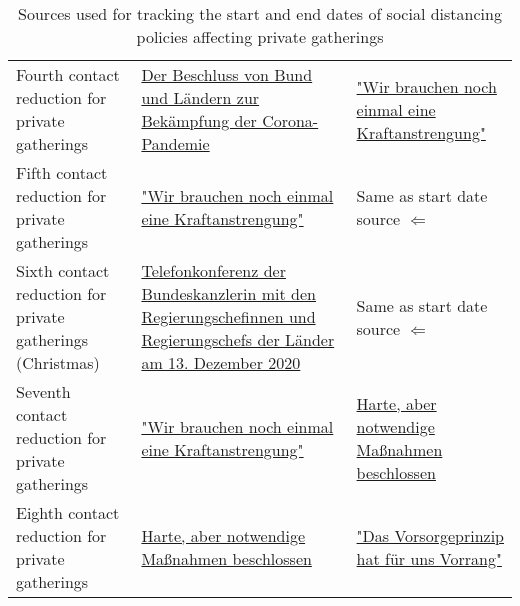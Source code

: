 \begin{table}[hbt!]
{\begin{tabular}{|| L | L | L ||}
 Fourth contact reduction for private gatherings & \href{https://www.bundesregierung.de/breg-de/suche/bund-laender-beschluss-1805264}{Der Beschluss von Bund und Ländern zur Bekämpfung der Corona-Pandemie} & \href{https://www.bundesregierung.de/breg-de/suche/mpk-corona-1820046}{"Wir brauchen noch einmal eine Kraftanstrengung"}  \\

 Fifth contact reduction for private gatherings & \href{https://www.bundesregierung.de/breg-de/suche/mpk-corona-1820046}{"Wir brauchen noch einmal eine Kraftanstrengung"} & Same  as start date source $\Leftarrow$ \\

 Sixth contact reduction for private gatherings (Christmas) & \href{https://www.bundesregierung.de/breg-de/suche/telefonkonferenz-der-bundeskanzlerin-mit-den-regierungschefinnen-und-regierungschefs-der-laender-am-13-dezember-2020-1827392}{Telefonkonferenz der Bundeskanzlerin mit den Regierungschefinnen und Regierungschefs der Länder am 13. Dezember 2020} & Same as start date source $\Leftarrow$ \\

 Seventh contact reduction for private gatherings & \href{https://www.bundesregierung.de/breg-de/suche/mpk-corona-1820046}{"Wir brauchen noch einmal eine Kraftanstrengung"} & \href{https://www.bundesregierung.de/breg-de/themen/coronavirus/mpk-beschluss-corona-1834364}{Harte, aber notwendige Maßnahmen beschlossen}  \\

 Eighth contact reduction for private gatherings & \href{https://www.bundesregierung.de/breg-de/themen/coronavirus/mpk-beschluss-corona-1834364}{Harte, aber notwendige Maßnahmen beschlossen} & \href{https://www.bundesregierung.de/breg-de/suche/bund-laender-beschluss-1841048}{"Das Vorsorgeprinzip hat für uns Vorrang"} \\[1ex]
 \hline
 \end{tabular}
 }

 \caption{Sources used for tracking the start and end dates of social distancing policies affecting private gatherings}
\label{table:3}
\end{table}
